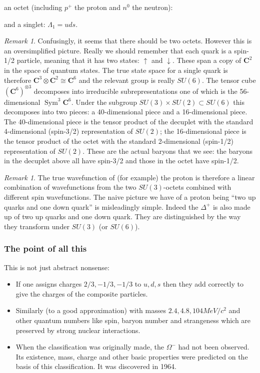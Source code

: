 \documentclass[12pt]{article}
\newcommand{\CC}{\mathbf{C}}
\newcommand{\OP}{\operatorname}
\newcommand{\Sym}{\OP{Sym}}
\theoremstyle{definition}
\theoremstyle{check}
\theoremstyle{remark}
\newtheorem{rmk}[thm]{Remark}
\theoremstyle{TheoremNum}
\begin{document}
\decuplet

an octet (including $p^+$ the proton and $n^0$ the neutron):

\baryonoctet

and a singlet: $\Lambda_1=uds$.

\begin{rmk}
Confusingly, it seems that there should be two octets. However this is an oversimplified picture. Really we should remember that each quark is a spin-1/2 particle, meaning that it has two states: $\uparrow$ and $\downarrow$. These span a copy of $\CC^2$ in the space of quantum states. The true state space for a single quark is therefore $\CC^3\otimes\CC^2\cong\CC^6$ and the relevant group is really $SU(6)$. The tensor cube $(\CC^6)^{\otimes 3}$ decomposes into irreducible subrepresentations one of which is the 56-dimensional $\Sym^3\CC^6$. Under the subgroup $SU(3)\times SU(2)\subset SU(6)$ this decomposes into two pieces: a 40-dimensional piece and a 16-dimensional piece. The 40-dimensional piece is the tensor product of the decuplet with the standard 4-dimensional (spin-3/2) representation of $SU(2)$; the 16-dimensional piece is the tensor product of the octet with the standard 2-dimensional (spin-1/2) representation of $SU(2)$. These are the actual baryons that we see: the baryons in the decuplet above all have spin-3/2 and those in the octet have spin-1/2.
\end{rmk}
\begin{rmk}
The true wavefunction of (for example) the proton is therefore a linear combination of wavefunctions from the two $SU(3)$-octets combined with different spin wavefunctions. The naive picture we have of a proton being ``two up quarks and one down quark'' is misleadingly simple. Indeed the $\Delta^+$ is also made up of two up quarks and one down quark. They are distinguished by the way they transform under $SU(3)$ (or $SU(6)$).
\end{rmk}

\subsubsection{The point of all this}

This is not just abstract nonsense:
\begin{itemize}
\item If one assigns charges $2/3,-1/3,-1/3$ to $u,d,s$ then they add correctly to give the charges of the composite particles.
\item Similarly (to a good approximation) with masses $2.4,4.8,104MeV/c^2$ and other quantum numbers like spin, baryon number and strangeness which are preserved by strong nuclear interactions.
\item When the classification was originally made, the $\Omega^-$ had not been observed. Its existence, mass, charge and other basic properties were predicted on the basis of this classification. It was discovered \cite{omega} in 1964.
\end{itemize}
\end{document}
